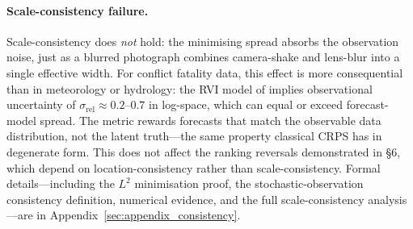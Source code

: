 \paragraph{Scale-consistency failure.}
Scale-consistency does \emph{not} hold: the minimising spread absorbs the observation noise, just as a blurred photograph combines camera-shake and lens-blur into a single effective width. For conflict fatality data, this effect is more consequential than in meteorology or hydrology: the RVI model of \citet{vesco2026uncertainty} implies observational uncertainty of $\sigma_\text{rel} \approx 0.2$--$0.7$ in log-space, which can equal or exceed forecast-model spread. The metric rewards forecasts that match the observable data distribution, not the latent truth---the same property classical CRPS has in degenerate form. This does not affect the ranking reversals demonstrated in \S6, which depend on location-consistency rather than scale-consistency. Formal details---including the $L^2$ minimisation proof, the stochastic-observation consistency definition, numerical evidence, and the full scale-consistency analysis---are in Appendix~\ref{sec:appendix_consistency}.
